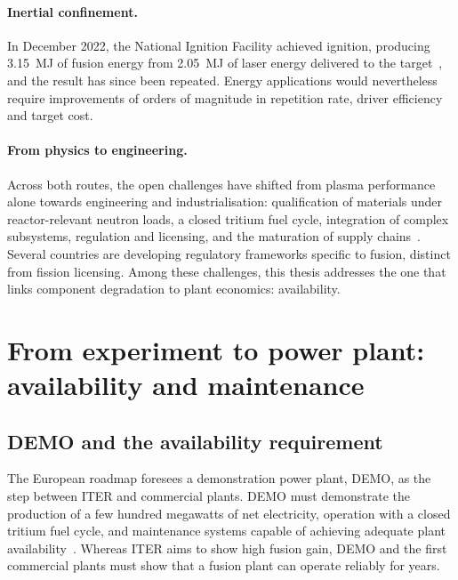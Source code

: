 \documentclass{book}
\begin{document}
\paragraph{Inertial confinement.}
In December 2022, the National Ignition Facility achieved ignition, producing
\SI{3.15}{MJ} of fusion energy from \SI{2.05}{MJ} of laser energy delivered to
the target~\cite{llnl_nif_ignition_2022}, and the result has since been
repeated. Energy applications would nevertheless require improvements of
orders of magnitude in repetition rate, driver efficiency and target cost.

\paragraph{From physics to engineering.}
Across both routes, the open challenges have shifted from plasma performance
alone towards engineering and industrialisation: qualification of materials
under reactor-relevant neutron loads, a closed tritium fuel cycle, integration
of complex subsystems, regulation and licensing, and the maturation of supply
chains~\cite{iaea_wfo_2025,fusion_industry_association_2024}. Several
countries are developing regulatory frameworks specific to fusion, distinct
from fission licensing. Among these challenges, this thesis addresses the one
that links component degradation to plant economics: availability.

\section{From experiment to power plant: availability and maintenance}
\label{sec:demo_availability}

\subsection{DEMO and the availability requirement}

The European roadmap foresees a demonstration power plant, DEMO, as the step
between ITER and commercial plants. DEMO must demonstrate the production of a
few hundred megawatts of net electricity, operation with a closed tritium fuel
cycle, and maintenance systems capable of achieving adequate plant
availability~\cite{federici2019demo}. Whereas ITER aims to show high fusion
gain, DEMO and the first commercial plants must show that a fusion plant can
operate reliably for years.
\end{document}
